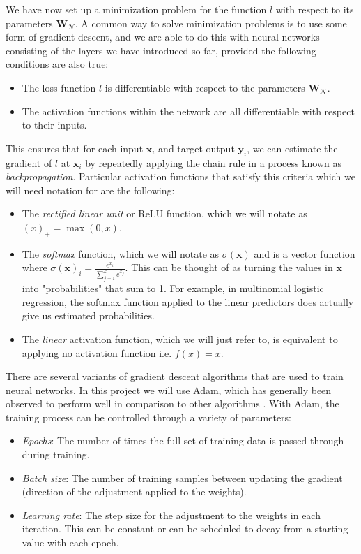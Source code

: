 \documentclass{somasmsc}
\begin{document}
We have now set up a minimization problem for the function $l$ with respect to its parameters $\mathbf{W}_{\mathcal{N}}$. A common way to solve minimization problems is to use some form of gradient descent, and we are able to do this with neural networks consisting of the layers we have introduced so far, provided the following conditions are also true:
\begin{itemize}
    \item The loss function $l$ is differentiable with respect to the parameters $\mathbf{W}_{\mathcal{N}}$.
    \item The activation functions within the network are all differentiable with respect to their inputs.
\end{itemize}
This ensures that for each input $\pmb{x}_i$ and target output $\pmb{y}_i$, we can estimate the gradient of $l$ at $\pmb{x}_i$ by repeatedly applying the chain rule in a process known as \textit{backpropagation}. Particular activation functions that satisfy this criteria which we will need notation for are the following:
\begin{itemize}
    \item The \textit{rectified linear unit} or ReLU function, which we will notate as $\left(x\right)_+ = \max{\left(0, x\right)}$.
    \item The \textit{softmax} function, which we will notate as $\sigma\left(\pmb{x}\right)$ and is a vector function where $\sigma\left(\pmb{x}\right)_i = \frac{e^{x_i}}{\sum_{j=1}^k e^{x_j}}$. This can be thought of as turning the values in $\pmb{x}$ into "probabilities" that sum to 1. For example, in multinomial logistic regression, the softmax function applied to the linear predictors does actually give us estimated probabilities.
    \item The \textit{linear} activation function, which we will just refer to, is equivalent to applying no activation function i.e. $f\left(x\right) = x$.
\end{itemize}

There are several variants of gradient descent algorithms that are used to train neural networks. In this project we will use Adam, which has generally been observed to perform well in comparison to other algorithms \citep{kingma2014adam}. With Adam, the training process can be controlled through a variety of parameters:
\begin{itemize}
    \item \textit{Epochs}: The number of times the full set of training data is passed through during training.
    \item \textit{Batch size}: The number of training samples between updating the gradient (direction of the adjustment applied to the weights).
    \item \textit{Learning rate}: The step size for the adjustment to the weights in each iteration. This can be constant or can be scheduled to decay from a starting value with each epoch.
\end{itemize}
\end{document}
